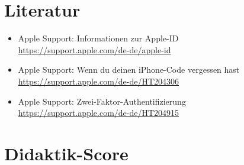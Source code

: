 \documentclass[11pt,a4paper]{article}
\begin{document}
\section{Literatur}

\begin{itemize}
    \item Apple Support: Informationen zur Apple-ID\\
          \url{https://support.apple.com/de-de/apple-id}
    \item Apple Support: Wenn du deinen iPhone-Code vergessen hast\\
          \url{https://support.apple.com/de-de/HT204306}
    \item Apple Support: Zwei-Faktor-Authentifizierung\\
          \url{https://support.apple.com/de-de/HT204915}
\end{itemize}

\newpage
\section{Didaktik-Score}
\end{document}
